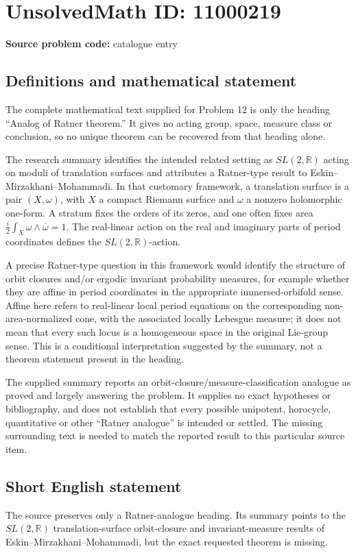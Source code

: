 \documentclass[11pt]{article}
\newcommand{\R}{\mathbb{R}}
\begin{document}
\section*{UnsolvedMath ID: 11000219}
\textbf{Source problem code:} catalogue entry
\subsection{Definitions and mathematical statement}
The complete mathematical text supplied for Problem 12 is only the heading ``Analog of Ratner theorem.'' It gives no acting group, space, measure class or conclusion, so no unique theorem can be recovered from that heading alone.

The research summary identifies the intended related setting as \(SL(2,\R)\) acting on moduli of translation surfaces and attributes a Ratner-type result to Eskin--Mirzakhani--Mohammadi. In that customary framework, a translation surface is a pair \((X,\omega)\), with \(X\) a compact Riemann surface and \(\omega\) a nonzero holomorphic one-form. A stratum fixes the orders of its zeros, and one often fixes area \(\frac{i}{2}\int_X\omega\wedge\overline\omega=1\). The real-linear action on the real and imaginary parts of period coordinates defines the \(SL(2,\R)\)-action.

A precise Ratner-type question in this framework would identify the structure of orbit closures and/or ergodic invariant probability measures, for example whether they are affine in period coordinates in the appropriate immersed-orbifold sense. Affine here refers to real-linear local period equations on the corresponding non-area-normalized cone, with the associated locally Lebesgue measure; it does not mean that every such locus is a homogeneous space in the original Lie-group sense. This is a conditional interpretation suggested by the summary, not a theorem statement present in the heading.

The supplied summary reports an orbit-closure/measure-classification analogue as proved and largely answering the problem. It supplies no exact hypotheses or bibliography, and does not establish that every possible unipotent, horocycle, quantitative or other ``Ratner analogue'' is intended or settled. The missing surrounding text is needed to match the reported result to this particular source item.
\subsection{Short English statement}
The source preserves only a Ratner-analogue heading. Its summary points to the \(SL(2,\R)\) translation-surface orbit-closure and invariant-measure results of Eskin--Mirzakhani--Mohammadi, but the exact requested theorem is missing.
\end{document}
